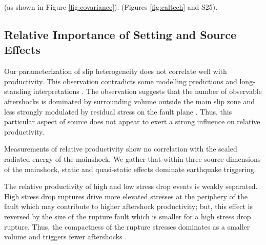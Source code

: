 \documentclass[draft, jgrga]{agujournal2018}
\begin{document}
 (as shown in Figure \ref{fig:covariance}).  (Figures \ref{fig:caltech} and S25). 

\subsection{Relative Importance of Setting and Source Effects}

Our parameterization of slip heterogeneity does not correlate well with productivity. This observation contradicts some modelling predictions \citep{Helmstetter2006RelationModel, Marsan2006} and long-standing interpretations \citep{Mogi1967}. The observation suggests that the number of observable aftershocks is dominated by surrounding volume outside the main slip zone and less strongly modulated by residual stress on the fault plane \citep[as would be consistent with][]{Wetzler2018SystematicEarthquakes}. Thus, this particular aspect of source does not appear to exert a strong influence on relative productivity.

Measurements of relative productivity show no correlation with the scaled radiated energy of the mainshock. We gather that within three source dimensions of the mainshock, static and quasi-static effects dominate earthquake triggering.

The relative productivity of high and low stress drop events is weakly separated. High stress drop ruptures drive more elevated stresses at the periphery of the fault which may contribute to higher aftershock productivity; but, this effect is reversed by the size of the rupture fault which is smaller for a high stress drop rupture. Thus, the compactness of the rupture stresses dominates as a smaller volume and triggers fewer aftershocks \citep{Wetzler2016}.
\end{document}
